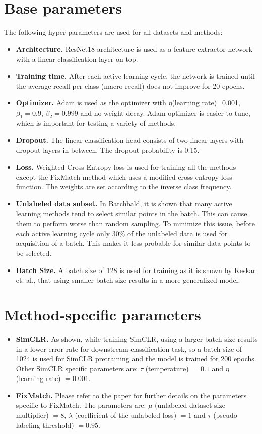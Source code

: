 \section{Base parameters}\label{section:base_parameters}
The following hyper-parameters are used for all datasets and methods:
\begin{itemize}
  \item \textbf{Architecture.} ResNet18\cite{he2016} architecture is used as a feature extractor network with a linear classification layer on top.
  \item \textbf{Training time.} After each active learning cycle, the network is trained until the average recall per class (macro-recall) does not improve for 20 epochs.
  \item \textbf{Optimizer.} Adam\cite{kingma2014} is used as the optimizer with $\eta$(learning rate)=0.001, $\beta_1=0.9$, $\beta_2=0.999$ and no weight decay. Adam optimizer is easier to tune\cite{schneider2019}, which is important for testing a variety of methods.
  \item \textbf{Dropout.} The linear classification head consists of two linear layers with dropout layers in between. The dropout probability is 0.15.
  \item \textbf{Loss.} Weighted Cross Entropy loss is used for training all the methods except the FixMatch method which uses a modified cross entropy loss function. The weights are set according to the inverse class frequency.
  \item \textbf{Unlabeled data subset.} In Batchbald\cite{kirsch2019}, it is shown that many active learning methods tend to select similar points in the batch. This can cause them to perform worse than random sampling. To minimize this issue, before each active learning cycle only 30\% of the unlabeled data is used for acquisition of a batch. This makes it less probable for similar data points to be selected.
  \item \textbf{Batch Size.} A batch size of 128 is used for training as it is shown by Keskar et. al.\cite{keskar2016}, that using smaller batch size results in a more generalized model.
\end{itemize}
\section{Method-specific parameters}\label{section:method_specific_parameters}
\begin{itemize}
  \item \textbf{SimCLR.} As shown\cite{chen2020}, while training SimCLR, using a larger batch size results in a lower error rate for downstream classification task, so a batch size of 1024 is used for SimCLR pretraining and the model is trained for 200 epochs. Other SimCLR specific parameters are: $\tau$ (temperature) $= 0.1$ and $\eta$ (learning rate) $= 0.001$.
  \item \textbf{FixMatch.} Please refer to the paper for further details on the parameters specific to FixMatch. The parameters are: $\mu$ (unlabeled dataset size multiplier) $=8$, $\lambda$ (coefficient of the unlabeled loss) $=1$ and $\tau$ (pseudo labeling threshold) $=0.95$.
\end{itemize}

